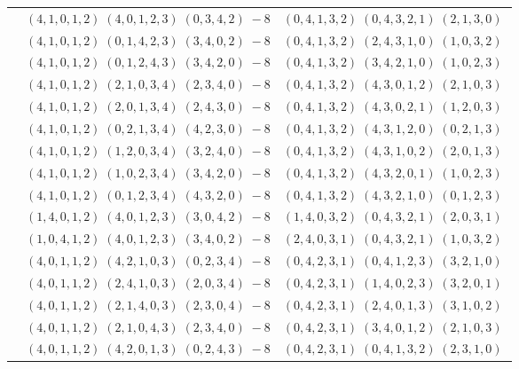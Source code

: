 \documentclass[11pt]{article}
\begin{document}
\begin{longtable}[l]{|c|c|c|}
 \cline{2-3} 
 & $(4 ,1 ,0 ,1 ,2) \;(4 ,0 ,1 ,2 ,3) \;(0 ,3 ,4 ,2) \;-8$ & $(0 ,4 ,1 ,3 ,2) \;(0 ,4 ,3 ,2 ,1) \;(2 ,1 ,3 ,0) \;$\\ 
 \cline{2-3} 
 & $(4 ,1 ,0 ,1 ,2) \;(0 ,1 ,4 ,2 ,3) \;(3 ,4 ,0 ,2) \;-8$ & $(0 ,4 ,1 ,3 ,2) \;(2 ,4 ,3 ,1 ,0) \;(1 ,0 ,3 ,2) \;$\\ 
 \cline{2-3} 
 & $(4 ,1 ,0 ,1 ,2) \;(0 ,1 ,2 ,4 ,3) \;(3 ,4 ,2 ,0) \;-8$ & $(0 ,4 ,1 ,3 ,2) \;(3 ,4 ,2 ,1 ,0) \;(1 ,0 ,2 ,3) \;$\\ 
 \cline{2-3} 
 & $(4 ,1 ,0 ,1 ,2) \;(2 ,1 ,0 ,3 ,4) \;(2 ,3 ,4 ,0) \;-8$ & $(0 ,4 ,1 ,3 ,2) \;(4 ,3 ,0 ,1 ,2) \;(2 ,1 ,0 ,3) \;$\\ 
 \cline{2-3} 
 & $(4 ,1 ,0 ,1 ,2) \;(2 ,0 ,1 ,3 ,4) \;(2 ,4 ,3 ,0) \;-8$ & $(0 ,4 ,1 ,3 ,2) \;(4 ,3 ,0 ,2 ,1) \;(1 ,2 ,0 ,3) \;$\\ 
 \cline{2-3} 
 & $(4 ,1 ,0 ,1 ,2) \;(0 ,2 ,1 ,3 ,4) \;(4 ,2 ,3 ,0) \;-8$ & $(0 ,4 ,1 ,3 ,2) \;(4 ,3 ,1 ,2 ,0) \;(0 ,2 ,1 ,3) \;$\\ 
 \cline{2-3} 
 & $(4 ,1 ,0 ,1 ,2) \;(1 ,2 ,0 ,3 ,4) \;(3 ,2 ,4 ,0) \;-8$ & $(0 ,4 ,1 ,3 ,2) \;(4 ,3 ,1 ,0 ,2) \;(2 ,0 ,1 ,3) \;$\\ 
 \cline{2-3} 
 & $(4 ,1 ,0 ,1 ,2) \;(1 ,0 ,2 ,3 ,4) \;(3 ,4 ,2 ,0) \;-8$ & $(0 ,4 ,1 ,3 ,2) \;(4 ,3 ,2 ,0 ,1) \;(1 ,0 ,2 ,3) \;$\\ 
 \cline{2-3} 
 & $(4 ,1 ,0 ,1 ,2) \;(0 ,1 ,2 ,3 ,4) \;(4 ,3 ,2 ,0) \;-8$ & $(0 ,4 ,1 ,3 ,2) \;(4 ,3 ,2 ,1 ,0) \;(0 ,1 ,2 ,3) \;$\\ 
 \cline{2-3} 
 & $(1 ,4 ,0 ,1 ,2) \;(4 ,0 ,1 ,2 ,3) \;(3 ,0 ,4 ,2) \;-8$ & $(1 ,4 ,0 ,3 ,2) \;(0 ,4 ,3 ,2 ,1) \;(2 ,0 ,3 ,1) \;$\\ 
 \cline{2-3} 
 & $(1 ,0 ,4 ,1 ,2) \;(4 ,0 ,1 ,2 ,3) \;(3 ,4 ,0 ,2) \;-8$ & $(2 ,4 ,0 ,3 ,1) \;(0 ,4 ,3 ,2 ,1) \;(1 ,0 ,3 ,2) \;$\\ 
 \cline{2-3} 
 & $(4 ,0 ,1 ,1 ,2) \;(4 ,2 ,1 ,0 ,3) \;(0 ,2 ,3 ,4) \;-8$ & $(0 ,4 ,2 ,3 ,1) \;(0 ,4 ,1 ,2 ,3) \;(3 ,2 ,1 ,0) \;$\\ 
 \cline{2-3} 
 & $(4 ,0 ,1 ,1 ,2) \;(2 ,4 ,1 ,0 ,3) \;(2 ,0 ,3 ,4) \;-8$ & $(0 ,4 ,2 ,3 ,1) \;(1 ,4 ,0 ,2 ,3) \;(3 ,2 ,0 ,1) \;$\\ 
 \cline{2-3} 
 & $(4 ,0 ,1 ,1 ,2) \;(2 ,1 ,4 ,0 ,3) \;(2 ,3 ,0 ,4) \;-8$ & $(0 ,4 ,2 ,3 ,1) \;(2 ,4 ,0 ,1 ,3) \;(3 ,1 ,0 ,2) \;$\\ 
 \cline{2-3} 
 & $(4 ,0 ,1 ,1 ,2) \;(2 ,1 ,0 ,4 ,3) \;(2 ,3 ,4 ,0) \;-8$ & $(0 ,4 ,2 ,3 ,1) \;(3 ,4 ,0 ,1 ,2) \;(2 ,1 ,0 ,3) \;$\\ 
 \cline{2-3} 
 & $(4 ,0 ,1 ,1 ,2) \;(4 ,2 ,0 ,1 ,3) \;(0 ,2 ,4 ,3) \;-8$ & $(0 ,4 ,2 ,3 ,1) \;(0 ,4 ,1 ,3 ,2) \;(2 ,3 ,1 ,0) \;$\\ 

\end{longtable}
\end{document}
